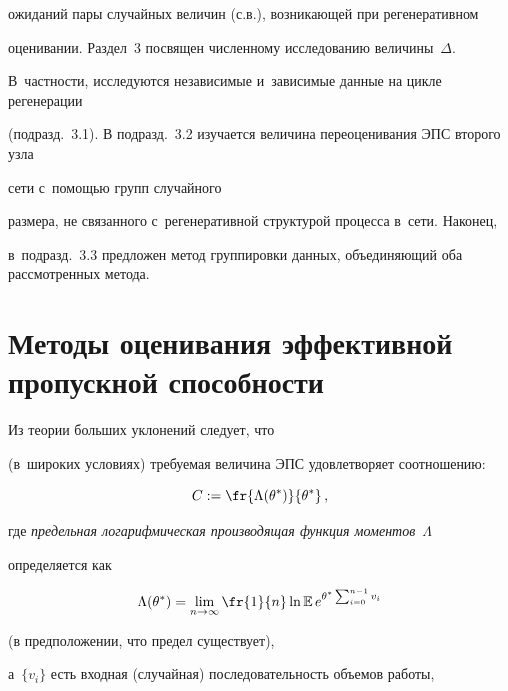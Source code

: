 ожиданий пары случайных величин (с.в.), возникающей при регенеративном 


оценивании.  Раздел~3 посвящен численному исследованию  величины~$\Delta$.  


В~частности, исследуются  независимые и~зависимые данные на цикле регенерации 


(подразд.~3.1). В подразд.~3.2 изучается величина переоценивания ЭПС второго узла 


сети с~помощью групп случайного 


размера, не связанного с~регенеративной структурой процесса в~сети.  Наконец, 


в~подразд.~3.3  предложен метод группировки данных, объединяющий оба рассмотренных  метода.








\section{Методы  оценивания эффективной пропускной способности}





 Из  теории больших уклонений  следует, что


 (в~широких условиях) требуемая величина ЭПС  удовлетворяет соотношению:


\begin{equation}


C:=\fr{\Lambda (\theta^*)}{\theta^*}\,,


\label{C}


\end{equation}


где  {\it предельная логарифмическая производящая функция моментов}~$\Lambda $ 


определяется как


\begin{equation}


\Lambda (\theta^*)= \lim\limits_{n\to \infty} \fr{1}{n} \ln \mathbb{E} \,


e^{\theta^*\sum\nolimits_{i=0}^{n-1} v_i}


\label{L}


\end{equation}


(в предположении, что предел существует),


а~$\{v_i\}$ есть  входная (случайная) последовательность объемов работы, 


